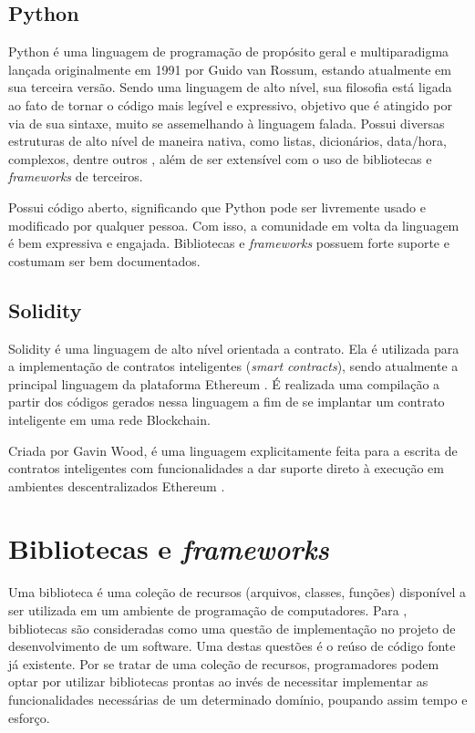 \subsection{Python}
Python é uma linguagem de programação de propósito geral 
e multiparadigma lançada originalmente em 1991 por Guido van Rossum, estando atualmente em sua terceira versão. Sendo uma linguagem de alto nível, sua filosofia está ligada ao fato de tornar o código mais legível e expressivo, objetivo que é atingido por via de sua sintaxe, muito se assemelhando à linguagem falada. Possui diversas estruturas de alto nível de maneira nativa, como listas, dicionários, data/hora, complexos, dentre outros \cite{Borges2010}, além de ser extensível com o uso de bibliotecas e \emph{frameworks} de terceiros. 

Possui código aberto, significando que Python pode ser livremente usado e modificado por qualquer pessoa. Com isso, a comunidade em volta da linguagem é bem expressiva e engajada. Bibliotecas e \emph{frameworks} possuem forte suporte e costumam ser bem documentados.

\subsection{Solidity}
Solidity é uma linguagem de alto nível orientada a contrato. Ela é utilizada para a implementação de contratos inteligentes (\emph{smart contracts}), sendo atualmente a principal linguagem da plataforma Ethereum \cite{Dannen2017-eb}. É realizada uma compilação a partir dos códigos gerados nessa linguagem a fim de se implantar um contrato inteligente em uma rede Blockchain.

Criada por Gavin Wood, é uma linguagem explicitamente feita para a escrita de contratos inteligentes com funcionalidades a dar suporte direto à execução em ambientes descentralizados Ethereum \cite{Antonopoulos2018-jt}.

\section{Bibliotecas e \emph{frameworks}}

Uma biblioteca é uma coleção de recursos (arquivos, classes, funções) disponível a ser utilizada em um ambiente de programação de computadores. Para \cite{Sommerville2011}, bibliotecas são consideradas como uma questão de implementação no projeto de desenvolvimento de um software. Uma destas questões é o reúso de código fonte já existente. Por se tratar de uma coleção de recursos, programadores podem optar por utilizar bibliotecas prontas ao invés de necessitar implementar as funcionalidades necessárias de um determinado domínio, poupando assim tempo e esforço.


